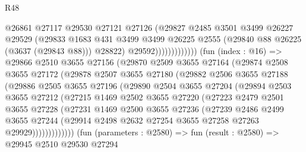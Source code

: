 \begin{lexlean}{R48}
\begin{coremodule}
                                @26861
                                @27117
                                @29530
                                @27121
                                @27126
                                (@29827
                                  @2485
                                  @3501
                                  @3499
                                  @26227
                                  @29529
                                  (@29833
                                    @1683
                                    @431
                                    @3499
                                    @3499
                                    @26225
                                    @2555
                                    (@29840 @88 @26225 (@3637 (@29843 @88)))
                                    @28822)
                                  @29592)))))))))))))
        (fun (index : @16) =>
        @29866
          @2510
          @3655
          @27156
          (@29870
            @2509
            @3655
            @27164
            (@29874
              @2508
              @3655
              @27172
              (@29878
                @2507
                @3655
                @27180
                (@29882
                  @2506
                  @3655
                  @27188
                  (@29886
                    @2505
                    @3655
                    @27196
                    (@29890
                      @2504
                      @3655
                      @27204
                      (@29894
                        @2503
                        @3655
                        @27212
                        (@27215
                          @1469
                          @2502
                          @3655
                          @27220
                          (@27223
                            @2479
                            @2501
                            @3655
                            @27228
                            (@27231
                              @1469
                              @2500
                              @3655
                              @27236
                              (@27239
                                @2486
                                @2499
                                @3655
                                @27244
                                (@29914 @2498 @2632 @27254 @3655 @27258 @27263 @29929)))))))))))))
        (fun (parameters : @2580) =>
        fun (result : @2580) =>
        @29945
          @2510
          @29530
          @27294

\end{coremodule}
\end{lexlean}
